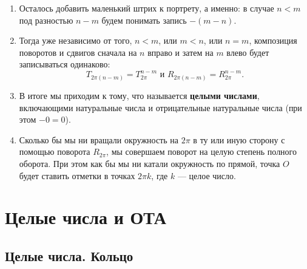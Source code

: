 \begin{enumerate}
\item Осталось добавить маленький штрих к портрету, а именно: в случае $n<m$ под разностью $n-m$ будем понимать запись $-(m-n)$.
\item Тогда уже независимо от того, $n<m$, или $m<n$, или $n=m$, композиция поворотов и сдвигов сначала на $n$ вправо и затем на $m$ влево будет записываться одинаково:
$$
T_{2\pi(n-m)}=T_{2\pi}^{n-m}\mbox{ и }R_{2\pi(n-m)}=R_{2\pi}^{n-m}.
$$
\item В итоге мы приходим к тому, что называется \textbf{целыми числами}, включающими натуральные числа и отрицательные натуральные числа (при этом $-0=0$).
\item Сколько бы мы ни вращали окружность на $2\pi$ в ту или иную сторону с помощью поворота $R_{2\pi}$, мы совершаем поворот на целую степень полного оборота. При этом как бы мы ни катали окружность по прямой, точка $O$ будет ставить отметки в точках $2\pi k$, где $k$ --- целое число.
\end{enumerate}



\chapter{Целые числа и ОТА}


\section{Целые числа. Кольцо}

